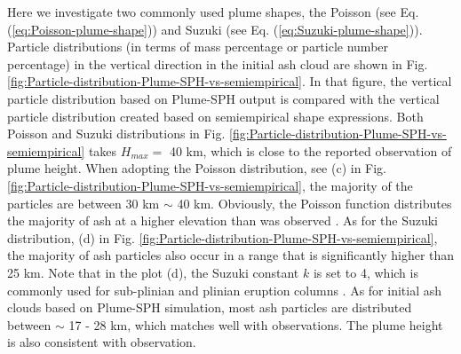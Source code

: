 \documentclass[utf8]{frontiersSCNS} %
\begin{document}
Here we investigate two commonly used plume shapes, the Poisson (see Eq. (\ref{eq:Poisson-plume-shape})) and Suzuki (see Eq. (\ref{eq:Suzuki-plume-shape})).
Particle distributions (in terms of mass percentage or particle number percentage) in the vertical direction in the initial ash cloud are shown in Fig. \ref{fig:Particle-distribution-Plume-SPH-vs-semiempirical}. In that figure, the vertical particle distribution based on Plume-SPH output is compared with the vertical particle distribution created based on semiempirical shape expressions. Both Poisson and Suzuki distributions in Fig. \ref{fig:Particle-distribution-Plume-SPH-vs-semiempirical} takes $H_{max} =$ 40 km, which is close to the reported observation of plume height. When adopting the Poisson distribution, see (c) in  Fig. \ref{fig:Particle-distribution-Plume-SPH-vs-semiempirical}, the majority of the particles are between 30 km $\sim$ 40 km. Obviously, the Poisson function distributes the majority of ash at a higher elevation than was observed \citep[e.g.][]{fero2008simulation}. As for the Suzuki distribution, (d) in  Fig. \ref{fig:Particle-distribution-Plume-SPH-vs-semiempirical}, the majority of ash particles also occur in a range that is significantly higher than 25 km. Note that in the plot (d), the Suzuki constant $k$ is set to 4, which is commonly used for sub-plinian and plinian eruption columns \citep{pfeiffer2005model}. As for initial ash clouds based on Plume-SPH simulation, most ash particles are distributed between $\sim$ 17 - 28 km, which matches well with observations. The plume height is also consistent with observation.
\end{document}
